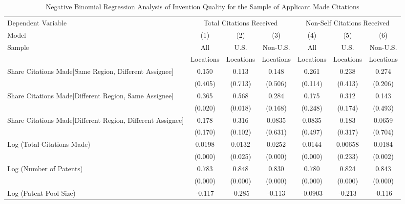 \begin{sidewaystable}[htbp]\centering
\caption{Negative Binomial Regression Analysis of Invention Quality for the Sample of Applicant Made Citations \label{a.model123192021}}
\small
\onehalfspacing
\begin{tabular}{l*{6}{c}}
\hline\hline
 Dependent Variable&\multicolumn{3}{c}{Total Citations Received}&\multicolumn{3}{c}{Non-Self Citations Received}\\
                Model&\multicolumn{1}{c}{(1)}&\multicolumn{1}{c}{(2)}&\multicolumn{1}{c}{(3)}&\multicolumn{1}{c}{(4)}&\multicolumn{1}{c}{(5)}&\multicolumn{1}{c}{(6)}\\
                 \hline
 \multirow{2}{*}{Sample}&\multicolumn{1}{c}{All}&\multicolumn{1}{c}{U.S.}&\multicolumn{1}{c}{Non-U.S.}&\multicolumn{1}{c}{All}&\multicolumn{1}{c}{U.S.}&\multicolumn{1}{c}{Non-U.S.}\\       
  &\multicolumn{1}{c}{Locations}&\multicolumn{1}{c}{Locations}&\multicolumn{1}{c}{Locations}&\multicolumn{1}{c}{Locations}&\multicolumn{1}{c}{Locations}&\multicolumn{1}{c}{Locations}\\       
\hline
Share Citations Made[Same Region, Different Assignee]&    0.150&    0.113&    0.148&    0.261&    0.238&    0.274\\
                &  (0.405)&  (0.713)&  (0.506)&  (0.114)&  (0.413)&  (0.206)\\
Share Citations Made[Different Region, Same Assignee]&    0.365&    0.568&    0.284&    0.175&    0.312&    0.143\\
                &  (0.020)&  (0.018)&  (0.168)&  (0.248)&  (0.174)&  (0.493)\\
Share Citations Made[Different Region, Different Assignee]&    0.178&    0.316&   0.0835&   0.0835&    0.183&   0.0659\\
                &  (0.170)&  (0.102)&  (0.631)&  (0.497)&  (0.317)&  (0.704)\\
Log (Total Citations Made)&   0.0198&   0.0132&   0.0252&   0.0144&  0.00658&   0.0184\\
                &  (0.000)&  (0.025)&  (0.000)&  (0.000)&  (0.233)&  (0.002)\\
Log (Number of Patents)&    0.783&    0.848&    0.830&    0.780&    0.824&    0.843\\
                &  (0.000)&  (0.000)&  (0.000)&  (0.000)&  (0.000)&  (0.000)\\
Log (Patent Pool Size)&   -0.117&   -0.285&   -0.113&  -0.0903&   -0.213&   -0.116\\

\end{tabular}
\end{sidewaystable}
